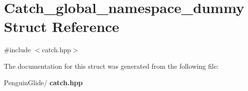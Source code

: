 \section{Catch\+\_\+global\+\_\+namespace\+\_\+dummy Struct Reference}
\label{struct_catch__global__namespace__dummy}


{\ttfamily \#include $<$catch.\+hpp$>$}



The documentation for this struct was generated from the following file\+:\begin{DoxyCompactItemize}
\item 
Penguin\+Glide/\textbf{ catch.\+hpp}\end{DoxyCompactItemize}
